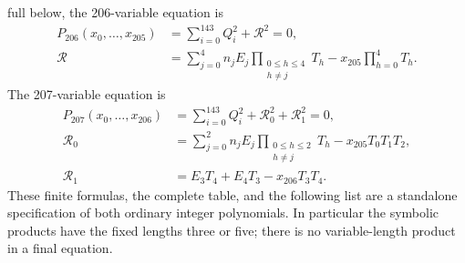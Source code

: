 full below, the 206-variable equation is
\begin{align*}
P_{206}(x_0,\ldots,x_{205})
&=\sum_{i=0}^{143}Q_i^2+\mathcal R^2=0,\\
\mathcal R
&=\sum_{j=0}^{4}n_jE_j\prod_{\substack{0\le h\le4\\h\ne j}}T_h
  -x_{205}\prod_{h=0}^{4}T_h.
\end{align*}
The 207-variable equation is
\begin{align*}
P_{207}(x_0,\ldots,x_{206})
&=\sum_{i=0}^{143}Q_i^2+\mathcal R_0^2+\mathcal R_1^2=0,\\
\mathcal R_0
&=\sum_{j=0}^{2}n_jE_j\prod_{\substack{0\le h\le2\\h\ne j}}T_h
  -x_{205}T_0T_1T_2,\\
\mathcal R_1&=E_3T_4+E_4T_3-x_{206}T_3T_4.
\end{align*}
These finite formulas, the complete table, and the following list are a
standalone specification of both ordinary integer polynomials. In
particular the symbolic products have the fixed lengths three or five;
there is no variable-length product in a final equation.

